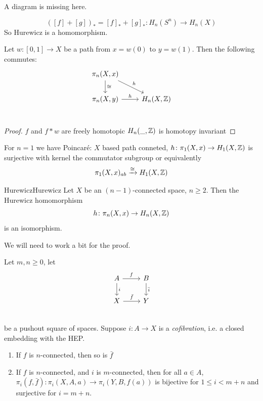 \documentclass[language=english]{TemplateLecture}
\begin{document}
A diagram is missing here. 

\[([f]+ [g])_* = [f]_* + [g]_* \colon H_n(S^n) \to H_n(X)\]
So Hurewicz is a homomorphism.

\begin{lem}{}{}
    Let \(w\colon [0,1]\to X\) be a path from \(x = w(0)\) to \(y = w(1)\). Then the following commutes:
    \[\begin{tikzcd}
        \pi_n(X,x) \ar[d, "\cong"] \ar[rd, "h"] & \\
        \pi_n(X,y) \ar[r, "h"] & H_n(X, \iz) \\ 
    \end{tikzcd}\]
\end{lem}

\begin{proof}
    \(f\) and \(f *w\) are freely homotopic \(H_n(\_, \mathbb{Z})\) is homotopy invariant
\end{proof}

For \(n = 1\) we have Poincaré: \(X\) based path conneted, \(h\colon \pi_1(X,x)\to H_1(X,\mathbb{Z})\) is surjective with kernel the commutator subgroup or equivalently
\[\pi_1(X,x)_{ab} \xrightarrow{\cong} H_1(X,\mathbb{Z})\]

\begin{thm}{Hurewicz}{Hurewicz}
    Let \(X\) be an \((n-1)\)-connected space, \(n\geq 2\). Then the Hurewicz homomorphism
    \[h\colon\pi_n(X,x) \to H_n(X,\mathbb{Z})\]
    is an isomorphism.
\end{thm}

We will need to work a bit for the proof.

\begin{proposition}
    Let \(m,n \geq 0\), let
    \[\begin{tikzcd}
        A \ar[r, "f"] \ar[d, "i"] & B \ar[d, "\bar i"]\\
        X \ar[r, "\bar f"] & Y \\
    \end{tikzcd}\]
    be a pushout square of spaces. Suppose \(i\colon A \to X\) is a \emph{cofibration}, i.e. a closed embedding with the HEP.
    \begin{enumerate}
        \item If \(f\) is \(n\)-connected, then so is \(\bar f\)
        \item If \(f\) is \(n\)-connected, and \(i\) is \(m\)-connected, then for all \(a \in A\), \(\pi_i(f, \bar f) \colon \pi_i(X,A, a) \to \pi_i(Y, B, f(a))\) is bijective for \(1 \leq i < m+n\) and surjective for \(i = m+n\).
    \end{enumerate}
\end{proposition}
\end{document}
